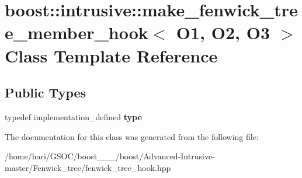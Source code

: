 \hypertarget{classboost_1_1intrusive_1_1make__fenwick__tree__member__hook}{}\section{boost\+:\+:intrusive\+:\+:make\+\_\+fenwick\+\_\+tree\+\_\+member\+\_\+hook$<$ O1, O2, O3 $>$ Class Template Reference}
\label{classboost_1_1intrusive_1_1make__fenwick__tree__member__hook}
\subsection*{Public Types}
\begin{DoxyCompactItemize}
\item 
\mbox{\label{classboost_1_1intrusive_1_1make__fenwick__tree__member__hook_ad113dd3ebabb90b71168df649ccd07f7}} 
typedef implementation\+\_\+defined {\bfseries type}
\end{DoxyCompactItemize}


The documentation for this class was generated from the following file\+:\begin{DoxyCompactItemize}
\item 
/home/hari/\+G\+S\+O\+C/boost\+\_\+\_\+\_/boost/\+Advanced-\/\+Intrusive-\/master/\+Fenwick\+\_\+tree/fenwick\+\_\+tree\+\_\+hook.\+hpp\end{DoxyCompactItemize}
